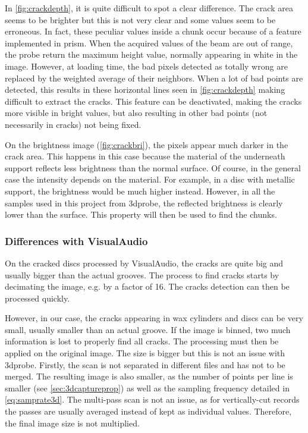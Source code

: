 In \autoref{fig:crackdepth}, it is quite difficult to spot a clear difference. The crack area seems to be brighter but this is not very clear and some values seem to be erroneous. In fact, these peculiar values inside a chunk occur because of a feature implemented in \gls{prism}. When the acquired values of the beam are out of range, the probe return the maximum height value, normally appearing in white in the image. However, at loading time, the bad pixels detected as totally wrong are replaced by the weighted average of their neighbors. When a lot of bad points are detected, this results in these horizontal lines seen in \autoref{fig:crackdepth} making difficult to extract the cracks. This feature can be deactivated, making the cracks more visible in bright values, but also resulting in other bad points (not necessarily in cracks) not being fixed.

On the brightness image (\autoref{fig:crackbri}), the pixels appear much darker in the crack area. This happens in this case because the material of the underneath support reflects less brightness than the normal surface. Of course, in the general case the intensity depends on the material. For example, in a disc with metallic support, the brightness would be much higher instead. However, in all the samples used in this project from \gls{3dprobe}, the reflected brightness is clearly lower than the surface. This property will then be used to find the chunks.

\subsubsection{Differences with VisualAudio}

On the cracked discs processed by VisualAudio, the cracks are quite big and usually bigger than the actual grooves. The process to find cracks starts by decimating the image, e.g. by a factor of 16. The cracks detection can then be processed quickly.

However, in our case, the cracks appearing in wax cylinders and discs can be very small, usually smaller than an actual groove. If the image is binned, two much information is lost to properly find all cracks. The processing must then be applied on the original image. The size is bigger but this is not an issue with \gls{3dprobe}. Firstly, the scan is not separated in different files and has not to be merged. The resulting image is also smaller, as the number of points per line is smaller (see \autoref{sec:3dcaptureprop}) as well as the sampling frequency detailed in \eqref{eq:samprate3d}. The multi-pass scan is not an issue, as for vertically-cut records the passes are usually averaged instead of kept as individual values. Therefore, the final image size is not multiplied.

